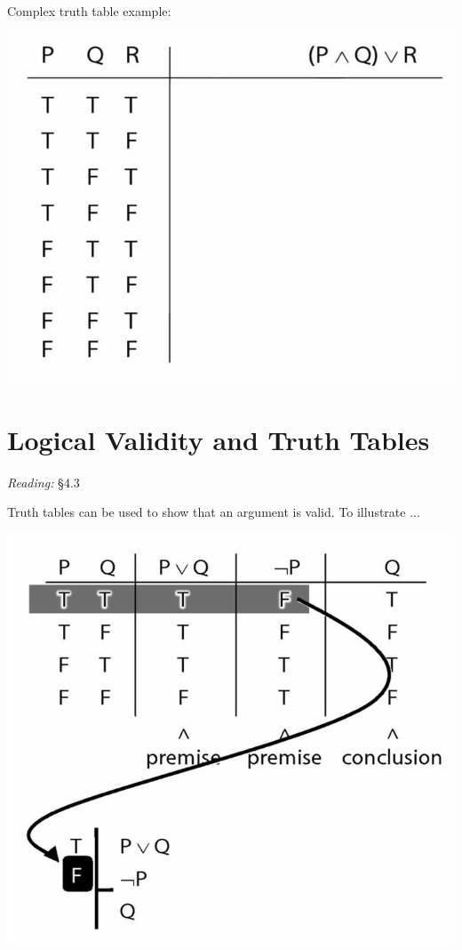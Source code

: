 \documentclass[12pt]{extarticle}
\begin{document}
\begin{multicols*}{3}
\begin{minipage}{\columnwidth}
Complex truth table example:
 
\begin{center}
\includegraphics[scale=0.3]{img/tt_p_and_q_or_r.png}
\end{center}
\end{minipage}
 
 
 
\section{Logical Validity and Truth Tables}
 
\emph{Reading:} §4.3
 
\begin{minipage}{\columnwidth}
 
Truth tables can be used to show that an argument is valid.
To illustrate ...
 
\begin{center}
\includegraphics[scale=0.3]{img/unit_14_example.png}
\end{center}
\end{minipage}
 

\end{multicols*}
\end{document}
